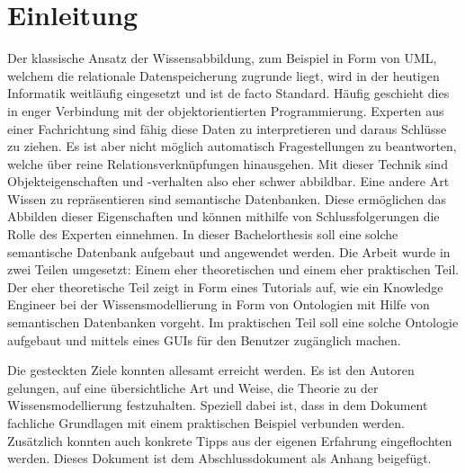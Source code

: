 \chapter{Einleitung}
\label{chap:einleitung}


Der klassische Ansatz der Wissensabbildung, zum Beispiel in Form von UML, welchem die relationale Datenspeicherung zugrunde liegt, wird in der heutigen Informatik weitläufig eingesetzt und ist de facto Standard. Häufig geschieht dies in enger Verbindung mit der objektorientierten Programmierung. Experten aus einer Fachrichtung sind fähig diese Daten zu interpretieren und daraus Schlüsse zu ziehen. Es ist aber nicht möglich automatisch Fragestellungen zu beantworten, welche über reine Relationsverknüpfungen hinausgehen. Mit dieser Technik sind Objekteigenschaften und -verhalten also eher schwer abbildbar. Eine andere Art Wissen zu repräsentieren sind semantische Datenbanken. Diese ermöglichen das Abbilden dieser Eigenschaften und können mithilfe von Schlussfolgerungen die Rolle des Experten einnehmen. 
In dieser Bachelorthesis soll eine solche semantische Datenbank aufgebaut und angewendet werden.  Die Arbeit wurde in zwei Teilen umgesetzt: Einem eher theoretischen und einem eher praktischen Teil. Der eher theoretische Teil zeigt in Form eines Tutorials auf, wie ein Knowledge Engineer bei der Wissensmodellierung in Form von Ontologien mit Hilfe von semantischen Datenbanken vorgeht. Im praktischen Teil soll eine solche Ontologie aufgebaut und mittels eines GUIs für den Benutzer zugänglich machen.

Die gesteckten Ziele konnten allesamt erreicht werden. Es ist den Autoren gelungen, auf eine übersichtliche Art und Weise, die Theorie zu der Wissensmodellierung festzuhalten. Speziell dabei ist, dass in dem Dokument fachliche Grundlagen mit einem praktischen Beispiel verbunden werden. Zusätzlich konnten auch konkrete Tipps aus der eigenen Erfahrung eingeflochten werden. Dieses Dokument ist dem Abschlussdokument als Anhang beigefügt. 


